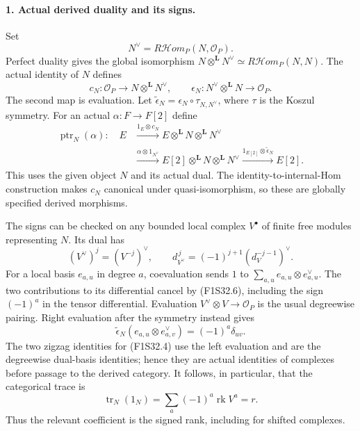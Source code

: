 \paragraph{1. Actual derived duality and its signs.}
Set
\[
 N^\vee=R\mathcal Hom_P(N,\mathcal O_P).
\]
Perfect duality gives the global isomorphism
$N\otimes^{\mathbf L}N^\vee
 \simeq R\mathcal Hom_P(N,N)$.
The actual identity of $N$ defines
\[
 c_N:\mathcal O_P\longrightarrow
                       N\otimes^{\mathbf L}N^\vee,
 \qquad
 \epsilon_N:N^\vee\otimes^{\mathbf L}N
                           \longrightarrow\mathcal O_P.
 \tag{F1S32.4}
\]
The second map is evaluation. Let
$\widetilde\epsilon_N
=\epsilon_N\circ\tau_{N,N^\vee}$, where $\tau$
is the Koszul symmetry.
For an actual $\alpha:F\to F[2]$ define
\[
\begin{split}
 \operatorname{ptr}_N(\alpha):\quad
 E&\xrightarrow{1_E\otimes c_N}
               E\otimes^{\mathbf L}N\otimes^{\mathbf L}N^\vee\\
  &\xrightarrow{\alpha\otimes1_{N^\vee}}
               E[2]\otimes^{\mathbf L}N\otimes^{\mathbf L}N^\vee
   \xrightarrow{1_{E[2]}\otimes\widetilde\epsilon_N}E[2].
\end{split}
 \tag{F1S32.5}
\]
This uses the given object $N$ and its actual dual.
The identity-to-internal-Hom construction makes
$c_N$ canonical under quasi-isomorphism, so these
are globally specified derived morphisms.

The signs can be checked on any bounded local
complex $V^\bullet$ of finite free modules
representing $N$. Its dual has
\[
 (V^\vee)^j=(V^{-j})^\vee,\qquad
 d_{V^\vee}^{\,j}=(-1)^{j+1}(d_V^{-j-1})^\vee.
 \tag{F1S32.6}
\]
For a local basis $e_{a,u}$ in degree $a$, coevaluation
sends $1$ to $\sum_{a,u}e_{a,u}\otimes e_{a,u}^\vee$.
The two contributions to its differential cancel
by (F1S32.6), including the sign $(-1)^a$ in the
tensor differential. Evaluation
$V^\vee\otimes V\to\mathcal O_P$ is the usual
degreewise pairing.
Right evaluation after the symmetry instead gives
\[
 \widetilde\epsilon_N(e_{a,u}\otimes e_{a,v}^\vee)
                      =(-1)^a\delta_{uv}.
 \tag{F1S32.7}
\]
The two zigzag identities for (F1S32.4) use the
left evaluation and are the degreewise dual-basis
identities; hence they are actual identities of
complexes before passage to the derived category.
It follows, in particular, that the categorical trace is
\[
             \operatorname{tr}_N(1_N)
                  =\sum_a(-1)^a\operatorname{rk}V^a=r.
 \tag{F1S32.8}
\]
Thus the relevant coefficient is the signed rank,
including for shifted complexes.

